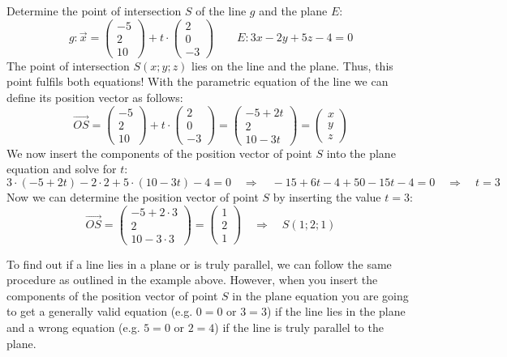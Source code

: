 \documentclass[12pt,eng]{skript_ogg}
\begin{document}
\begin{beispiel}
Determine the point of intersection $S$ of the line $g$ and the plane $E$:
\[g:\vec{x}=\begin{pmatrix}-5\\2\\10\end{pmatrix}+t\cdot \begin{pmatrix}2\\0\\-3\end{pmatrix}\qquad E:3x-2y+5z-4=0\]
The point of intersection $S(x;y;z)$ lies on the line and the plane. Thus, this point fulfils both equations! With the parametric equation of the line we can define its position vector as follows:
\[\overrightarrow{OS}=\begin{pmatrix}-5\\2\\10\end{pmatrix}+t\cdot \begin{pmatrix}2\\0\\-3\end{pmatrix}=\begin{pmatrix}-5+2t\\2\\10-3t\end{pmatrix}=\begin{pmatrix}x\\y\\z\end{pmatrix}\]
We now insert the components of the position vector of point $S$ into the plane equation and solve for $t$:
\[3\cdot(-5+2t)-2\cdot2+5\cdot(10-3t)-4=0\quad\Rightarrow\quad-15+6t-4+50-15t-4=0\quad\Rightarrow\quad t=3\]
Now we can determine the position vector of point $S$ by inserting the value $t=3$:
\[\overrightarrow{OS}=\begin{pmatrix}-5+2\cdot3\\2\\10-3\cdot3\end{pmatrix}=\begin{pmatrix}1\\2\\1\end{pmatrix}\quad\Rightarrow\quad S(1;2;1)\]
\end{beispiel}

\newpage

\begin{wichtig}
To find out if a line lies in a plane or is truly parallel, we can follow the same procedure as outlined in the example above. However, when you insert the components of the position vector of point $S$ in the plane equation you are going to get a generally valid equation (e.g. $0=0$ or $3=3$) if the line lies in the plane and a wrong equation (e.g. $5=0$ or $2=4$) if the line is truly parallel to the plane.
\end{wichtig}
\end{document}
